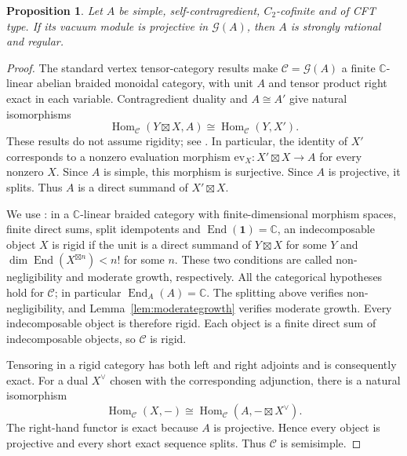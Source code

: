 \documentclass[11pt,reqno]{amsart}
\newtheorem{proposition}[theorem]{Proposition}
\theoremstyle{definition}\newtheorem{definition}[theorem]{Definition}
\theoremstyle{remark}\newtheorem{remark}[theorem]{Remark}
\newcommand{\C}{\mathbb C}\newcommand{\Z}{\mathbb Z}\newcommand{\Q}{\mathbb Q}
\numberwithin{equation}{section}
\begin{document}
\begin{proposition}\label{prop:projectivecriterion}
Let $A$ be simple, self-contragredient, $C_2$-cofinite and of CFT type. If its vacuum module is projective in $\mathcal G(A)$, then $A$ is strongly rational and regular.
\end{proposition}
\begin{proof}
The standard vertex tensor-category results make $\mathcal C=\mathcal G(A)$ a finite $\C$-linear abelian braided monoidal category, with unit $A$ and tensor product right exact in each variable. Contragredient duality and $A\cong A'$ give natural isomorphisms
\begin{equation}\label{eq:GVduality}
 \operatorname{Hom}_{\mathcal C}(Y\boxtimes X,A)
 \cong\operatorname{Hom}_{\mathcal C}(Y,X').
\end{equation}
These results do not assume rigidity; see \cite[Sections 2.3 and 3]{McRae}. In particular, the identity of $X'$ corresponds to a nonzero evaluation morphism $\mathrm{ev}_X:X'\boxtimes X\to A$ for every nonzero $X$. Since $A$ is simple, this morphism is surjective. Since $A$ is projective, it splits. Thus $A$ is a direct summand of $X'\boxtimes X$.

We use \cite[Theorem 1.1]{EP}: in a $\C$-linear braided category with finite-dimensional morphism spaces, finite direct sums, split idempotents and $\operatorname{End}(\mathbf1)=\C$, an indecomposable object $X$ is rigid if the unit is a direct summand of $Y\boxtimes X$ for some $Y$ and $\dim\operatorname{End}(X^{\boxtimes n})<n!$ for some $n$. These two conditions are called non-negligibility and moderate growth, respectively. All the categorical hypotheses hold for $\mathcal C$; in particular $\operatorname{End}_A(A)=\C$. The splitting above verifies non-negligibility, and Lemma~\ref{lem:moderategrowth} verifies moderate growth. Every indecomposable object is therefore rigid. Each object is a finite direct sum of indecomposable objects, so $\mathcal C$ is rigid.

Tensoring in a rigid category has both left and right adjoints and is consequently exact. For a dual $X^\vee$ chosen with the corresponding adjunction, there is a natural isomorphism
\[
 \operatorname{Hom}_{\mathcal C}(X,-)
 \cong\operatorname{Hom}_{\mathcal C}(A,-\boxtimes X^\vee).
\]
The right-hand functor is exact because $A$ is projective. Hence every object is projective and every short exact sequence splits. Thus $\mathcal C$ is semisimple.


\end{proof}
\end{document}
